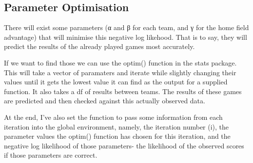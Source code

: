 \documentclass[]{article}
\newenvironment{Shaded}{\begin{snugshade}}{\end{snugshade}}
\newcommand{\KeywordTok}[1]{\textcolor[rgb]{0.13,0.29,0.53}{\textbf{#1}}}
\newcommand{\DecValTok}[1]{\textcolor[rgb]{0.00,0.00,0.81}{#1}}
\newcommand{\StringTok}[1]{\textcolor[rgb]{0.31,0.60,0.02}{#1}}
\newcommand{\CommentTok}[1]{\textcolor[rgb]{0.56,0.35,0.01}{\textit{#1}}}
\newcommand{\ControlFlowTok}[1]{\textcolor[rgb]{0.13,0.29,0.53}{\textbf{#1}}}
\newcommand{\OperatorTok}[1]{\textcolor[rgb]{0.81,0.36,0.00}{\textbf{#1}}}
\newcommand{\NormalTok}[1]{#1}
\begin{document}
\subsection{Parameter Optimisation}\label{parameter-optimisation}

There will exist some parameters (α and β for each team, and γ for the
home field advantage) that will minimise this negative log likehood.
That is to say, they will predict the results of the already played
games most accurately.

If we want to find those we can use the optim() function in the stats
package. This will take a vector of paramaters and iterate while
slightly changing their values until it gets the lowest value it can
find as the output for a supplied function. It also takes a df of
results between teams. The results of these games are predicted and then
checked against this actually observed data.

At the end, I've also set the function to pass some information from
each iteration into the global environment, namely, the iteration number
(i), the parameter values the optim() function has chosen for this
iteration, and the negative log likelihood of those parameters- the
likelihood of the observed scores if those parameters are correct.

\begin{Shaded}
\end{Shaded}
\end{document}
